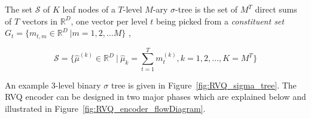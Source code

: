 \begin{Body}
The set $\mathcal{S}$ of $K$ leaf nodes of a $T$-level $M$-ary $\sigma$-tree is the set of $M^T$ direct sums of $T$ vectors in $\mathbb{R}^D$, one vector per level $t$ being picked from a \emph{constituent set} $G_t = \{m_{t,m} \in \mathbb{R}^D \ | m=1, 2, \ldots M\}$ \cite{2002_JNL_SigmaTrees_Barnes},

\begin{equation}
\mathcal{S} = \{\hat{\mu}^{(k)} \in \mathbb{R}^D \ | \ \hat{\mu}_k = \sum\limits_{t=1}^T m_t^{(k)}, k=1, 2, \ldots, K=M^T\}
\end{equation}

An example 3-level binary $\sigma$ tree is given in Figure~\ref{fig:RVQ_sigma_tree}.  The RVQ encoder can be designed in two major phases which are explained below and illustrated in Figure~\ref{fig:RVQ_encoder_flowDiagram}. 
 


 


\end{Body}
